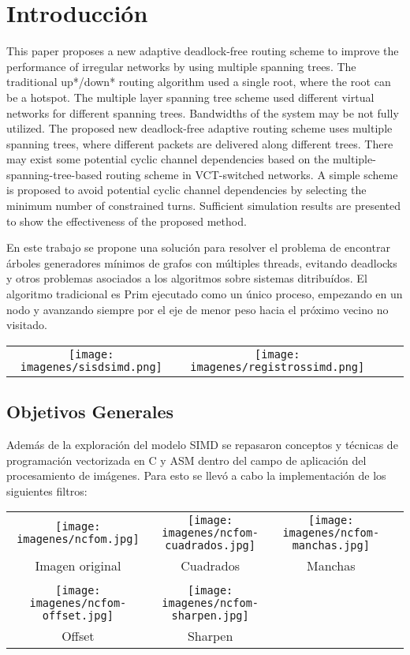 \section{Introducción}
This paper proposes a new adaptive deadlock-free routing scheme to improve the performance of irregular networks by using multiple spanning trees. The traditional up*/down* routing algorithm used a single root, where the root can be a hotspot. The multiple layer spanning tree scheme used different virtual networks for different spanning trees. Bandwidths of the system may be not fully utilized. The proposed new deadlock-free adaptive routing scheme uses multiple spanning trees, where different packets are delivered along different trees. There may exist some potential cyclic channel dependencies based on the multiple-spanning-tree-based routing scheme in VCT-switched networks. A simple scheme is proposed to avoid potential cyclic channel dependencies by selecting the minimum number of constrained turns. Sufficient simulation results are presented to show the effectiveness of the proposed method.

En este trabajo se propone una solución para resolver el problema de encontrar árboles generadores mínimos de grafos con múltiples threads, evitando deadlocks y otros problemas asociados a los algoritmos sobre sistemas ditribuídos. El algoritmo tradicional es Prim ejecutado como un único proceso, empezando en un nodo y avanzando siempre por el eje de menor peso hacia el próximo vecino no visitado.

\begin{center}
  \begin{tabular}{cccc}
    \texttt{[image: imagenes/sisdsimd.png]} &
    \texttt{[image: imagenes/registrossimd.png]}\\
  \end{tabular}
 \end{center}

\subsection{Objetivos Generales}
Además de la exploración del modelo SIMD se repasaron conceptos y técnicas de programación vectorizada en C y ASM dentro del campo de aplicación del procesamiento de imágenes. Para esto se llevó a cabo la implementación de los siguientes filtros:

\begin{center}
 \begin{tabular}{cccc}
   \texttt{[image: imagenes/ncfom.jpg]} &
   \texttt{[image: imagenes/ncfom-cuadrados.jpg]} &
   \texttt{[image: imagenes/ncfom-manchas.jpg]} \\
   Imagen original & Cuadrados & Manchas \\
   \\
   \texttt{[image: imagenes/ncfom-offset.jpg]} &
   \texttt{[image: imagenes/ncfom-sharpen.jpg]} \\
   Offset & Sharpen \\
 \end{tabular}
\end{center}

